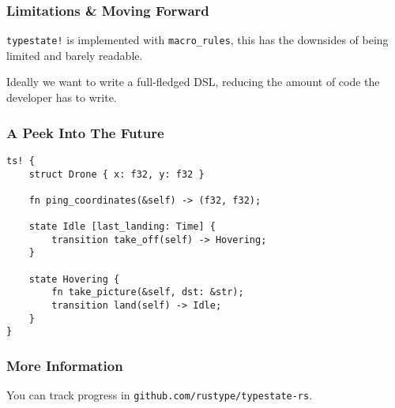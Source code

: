 \documentclass{beamer}
\begin{document}
\begin{frame}[fragile]
    \frametitle{Limitations \& Moving Forward}
    \texttt{typestate!} is implemented with \texttt{macro\_rules},
    this has the downsides of being limited and barely readable.

    Ideally we want to write a full-fledged DSL,
    reducing the amount of code the developer has to write.
\end{frame}

\begin{frame}[fragile]
    \frametitle{A Peek Into The Future}
    \begin{lstlisting}
ts! {
    struct Drone { x: f32, y: f32 }

    fn ping_coordinates(&self) -> (f32, f32);

    state Idle [last_landing: Time] {
        transition take_off(self) -> Hovering;
    }

    state Hovering {
        fn take_picture(&self, dst: &str);
        transition land(self) -> Idle;
    }
}
    \end{lstlisting}
\end{frame}

\begin{frame}
    \frametitle{More Information}

    You can track progress in \texttt{github.com/rustype/typestate-rs}.

\end{frame}
\end{document}
